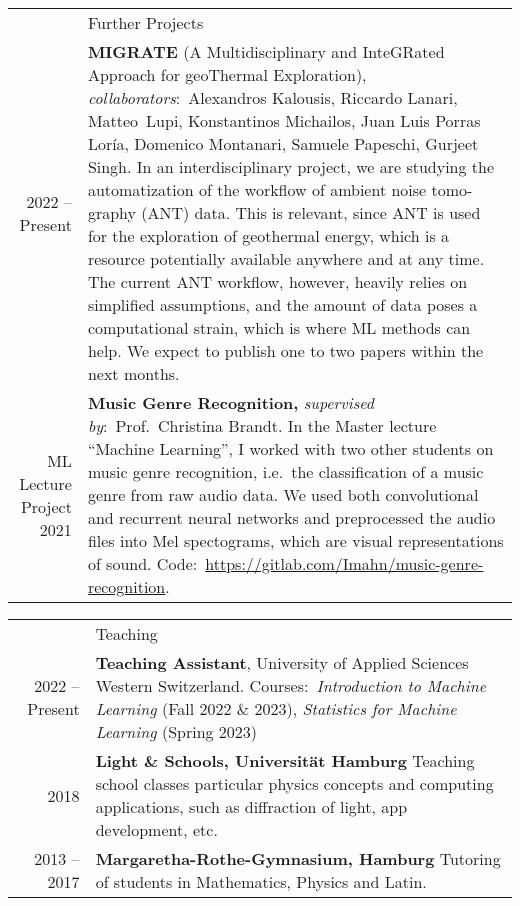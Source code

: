 \documentclass[11pt, a4paper]{article}
\newcommand{\headingfont}{\Large\color{OliveGreen}}
\newenvironment{SectionTable}[1]{
	\renewcommand*{\arraystretch}{1.7}
	\setlength{\tabcolsep}{10pt}
	\begin{longtable}{Rp{5.2in}} & #1 \\}
	{\end{longtable}\vspace{-.3cm}}
\begin{document}
	\begin{SectionTable}{\headingfont Further Projects}
		2022 -- Present & \textbf{MIGRATE} (A Multidisciplinary and InteGRated Approach for geoThermal Exploration), \textit{collaborators}:~Alexandros Kalousis, Riccardo Lanari, \mbox{Matteo Lupi}, Konstantinos Michailos,
        Juan Luis Porras Loría, Domenico \mbox{Montanari}, Samuele Papeschi, Gurjeet Singh. In an interdisciplinary project, we are \mbox{studying} the automatization of the workflow of ambient noise tomo-graphy (ANT) data. This is relevant, since ANT is used for the exploration of geothermal energy, which is a resource potentially available anywhere and at any time. The current ANT workflow, however, heavily relies on simplified assumptions, and the amount of data poses a computational strain, which is where ML methods can help. We expect to publish one to two papers within the next months.\\
        
        ML Lecture Project 2021 & \textbf{Music Genre Recognition,} \textit{supervised by}:~Prof.~Christina Brandt. In the Master lecture \enquote{Machine Learning}, I worked with two other 
        students on music genre recognition, i.e.~the classification of a music genre from raw audio data. We used both convolutional and recurrent neural networks and preprocessed the audio files into 
        Mel spectograms, which are visual representations of sound. Code:~\url{https://gitlab.com/Imahn/music-genre-recognition}.
		
	\end{SectionTable}

	\begin{SectionTable}{\headingfont Teaching}
		2022 -- Present & \textbf{Teaching Assistant}, University of Applied Sciences Western Switzerland. \newline Courses:~\textit{Introduction to Machine Learning} (Fall 2022 \& 2023), \textit{Statistics for Machine Learning} (Spring 2023) \\
		
		2018 & 
		\textbf{Light \& Schools, Universität Hamburg} \newline
		Teaching school classes particular physics concepts and computing applications, such as diffraction of light, app development, etc.\\ 
		
		2013 -- 2017 & \textbf{Margaretha-Rothe-Gymnasium, Hamburg} \newline 
		Tutoring of students in Mathematics, Physics and Latin. 
	\end{SectionTable}
    
\end{document}
